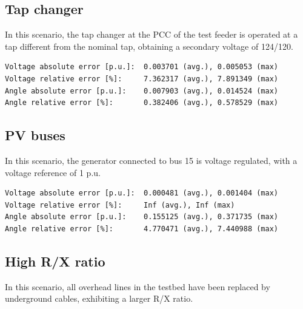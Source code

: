 \documentclass[10pt,letterpaper]{article}
\begin{document}
\def\octavedatam{data/data_5_voltagem.data}
\def\octavedataa{data/data_5_voltagea.data}


\subsection{Tap changer}

In this scenario, the tap changer at the PCC of the test feeder is operated at a tap different from the nominal tap, obtaining a secondary voltage of 124/120. 

\begin{verbatim}
Voltage absolute error [p.u.]:  0.003701 (avg.), 0.005053 (max)
Voltage relative error [%]:     7.362317 (avg.), 7.891349 (max)
Angle absolute error [p.u.]:    0.007903 (avg.), 0.014524 (max)
Angle relative error [%]:       0.382406 (avg.), 0.578529 (max)
\end{verbatim}

\def\octavedatam{data/data_6_voltagem.data}
\def\octavedataa{data/data_6_voltagea.data}


\subsection{PV buses}

In this scenario, the generator connected to bus 15 is voltage regulated, with a voltage reference of 1 p.u. 

\begin{verbatim}
Voltage absolute error [p.u.]:  0.000481 (avg.), 0.001404 (max)
Voltage relative error [%]:     Inf (avg.), Inf (max)
Angle absolute error [p.u.]:    0.155125 (avg.), 0.371735 (max)
Angle relative error [%]:       4.770471 (avg.), 7.440988 (max)
\end{verbatim}

\def\octavedatam{data/data_7_voltagem.data}
\def\octavedataa{data/data_7_voltagea.data}


\subsection{High R/X ratio}

In this scenario, all overhead lines in the testbed have been replaced by underground cables, exhibiting a larger R/X ratio. 
\end{document}
